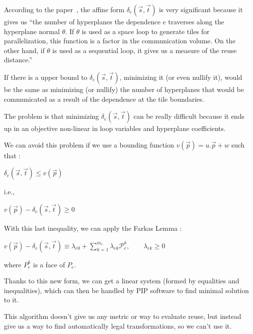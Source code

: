 \documentclass[paper=a4, fontsize=11.5pt]{scrartcl}
\numberwithin{equation}{section}        %
\numberwithin{figure}{section}          %
\numberwithin{table}{section}               %
\begin{document}
            According to the paper~\cite{Bondhugula:2008:PAP:1379022.1375595},
            the affine form $\delta_e\left(\vec{s},\vec{t}\right)$ is very significant
            because it gives us ``the number of hyperplanes the dependence $e$ traverses
            along the hyperplane normal $\theta$. If $\theta$ is used as a space loop to generate tiles
            for parallelization, this function is a factor in the communication
            volume. On the other hand, if $\theta$ is used as a sequential loop, it
            gives us a measure of the reuse distance.''

            If there is a upper bound to $\delta_e\left(\vec{s},\vec{t}\right)$,
            minimizing it (or even nullify it), would be the same as minimizing (or nullify)
            the number of hyperplanes that would be communicated as a result of
            the dependence at the tile boundaries.

            The problem is that minimizing $\delta_e\left(\vec{s},\vec{t}\right)$
            can be really difficult because it ends up in an objective non-linear
            in loop variables and hyperplane coefficients.

            We can avoid this problem if we use a bounding function $v(\vec{p}) = u.\vec{p} + w$ such that :
            \begin{center}
                $\delta_e\left(\vec{s},\vec{t}\right) \leq v(\vec{p})$
            \end{center}
            i.e.,
            \begin{center}
                $v(\vec{p}) - \delta_e\left(\vec{s},\vec{t}\right) \geq 0$
            \end{center}

            With this last inequality, we can apply the Farkas Lemma :
            \begin{center}
                $v(\vec{p}) - \delta_e\left(\vec{s},\vec{t}\right) \equiv \lambda_{e0}
                + \sum\limits_{k=1}^{m_e}{\lambda_{ek}\mathcal{P}_{e}^k},\qquad \lambda_{ek} \geq 0$
            \end{center}
            where $P_e^k$ is a face of $P_e$.

            Thanks to this new form, we can get a linear system (formed by equalities and
            inequalities), which can then be handled by PIP software to find
            minimal solution to it.

            This algorithm doesn't give us any metric or way to evaluate reuse, but instead
            give us a way to find automatically legal transformations, so we can't use it.
\end{document}
